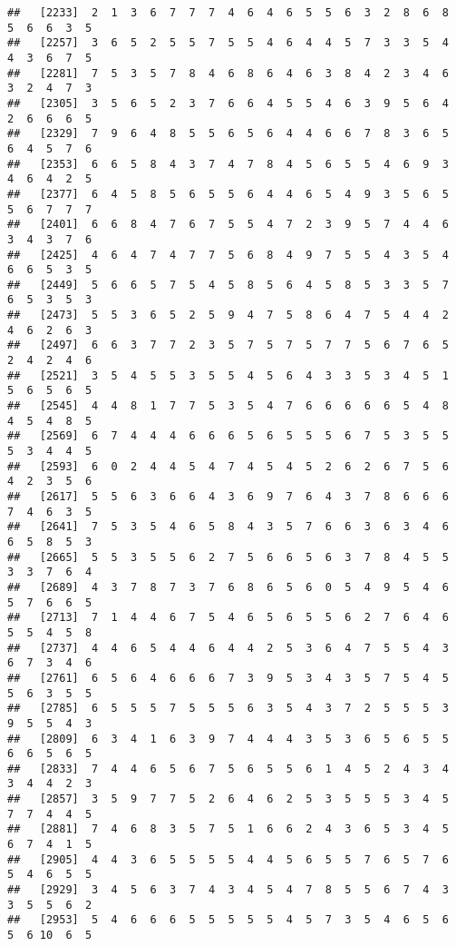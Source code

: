 \documentclass[
]{book}
\begin{document}
\begin{verbatim}
##   [2233]  2  1  3  6  7  7  7  4  6  4  6  5  5  6  3  2  8  6  8  5  6  6  3  5
##   [2257]  3  6  5  2  5  5  7  5  5  4  6  4  4  5  7  3  3  5  4  4  3  6  7  5
##   [2281]  7  5  3  5  7  8  4  6  8  6  4  6  3  8  4  2  3  4  6  3  2  4  7  3
##   [2305]  3  5  6  5  2  3  7  6  6  4  5  5  4  6  3  9  5  6  4  2  6  6  6  5
##   [2329]  7  9  6  4  8  5  5  6  5  6  4  4  6  6  7  8  3  6  5  6  4  5  7  6
##   [2353]  6  6  5  8  4  3  7  4  7  8  4  5  6  5  5  4  6  9  3  4  6  4  2  5
##   [2377]  6  4  5  8  5  6  5  5  6  4  4  6  5  4  9  3  5  6  5  5  6  7  7  7
##   [2401]  6  6  8  4  7  6  7  5  5  4  7  2  3  9  5  7  4  4  6  3  4  3  7  6
##   [2425]  4  6  4  7  4  7  7  5  6  8  4  9  7  5  5  4  3  5  4  6  6  5  3  5
##   [2449]  5  6  6  5  7  5  4  5  8  5  6  4  5  8  5  3  3  5  7  6  5  3  5  3
##   [2473]  5  5  3  6  5  2  5  9  4  7  5  8  6  4  7  5  4  4  2  4  6  2  6  3
##   [2497]  6  6  3  7  7  2  3  5  7  5  7  5  7  7  5  6  7  6  5  2  4  2  4  6
##   [2521]  3  5  4  5  5  3  5  5  4  5  6  4  3  3  5  3  4  5  1  5  6  5  6  5
##   [2545]  4  4  8  1  7  7  5  3  5  4  7  6  6  6  6  6  5  4  8  4  5  4  8  5
##   [2569]  6  7  4  4  4  6  6  6  5  6  5  5  5  6  7  5  3  5  5  5  3  4  4  5
##   [2593]  6  0  2  4  4  5  4  7  4  5  4  5  2  6  2  6  7  5  6  4  2  3  5  6
##   [2617]  5  5  6  3  6  6  4  3  6  9  7  6  4  3  7  8  6  6  6  7  4  6  3  5
##   [2641]  7  5  3  5  4  6  5  8  4  3  5  7  6  6  3  6  3  4  6  6  5  8  5  3
##   [2665]  5  5  3  5  5  6  2  7  5  6  6  5  6  3  7  8  4  5  5  3  3  7  6  4
##   [2689]  4  3  7  8  7  3  7  6  8  6  5  6  0  5  4  9  5  4  6  5  7  6  6  5
##   [2713]  7  1  4  4  6  7  5  4  6  5  6  5  5  6  2  7  6  4  6  5  5  4  5  8
##   [2737]  4  4  6  5  4  4  6  4  4  2  5  3  6  4  7  5  5  4  3  6  7  3  4  6
##   [2761]  6  5  6  4  6  6  6  7  3  9  5  3  4  3  5  7  5  4  5  5  6  3  5  5
##   [2785]  6  5  5  5  7  5  5  5  6  3  5  4  3  7  2  5  5  5  3  9  5  5  4  3
##   [2809]  6  3  4  1  6  3  9  7  4  4  4  3  5  3  6  5  6  5  5  6  6  5  6  5
##   [2833]  7  4  4  6  5  6  7  5  6  5  5  6  1  4  5  2  4  3  4  3  4  4  2  3
##   [2857]  3  5  9  7  7  5  2  6  4  6  2  5  3  5  5  5  3  4  5  7  7  4  4  5
##   [2881]  7  4  6  8  3  5  7  5  1  6  6  2  4  3  6  5  3  4  5  6  7  4  1  5
##   [2905]  4  4  3  6  5  5  5  5  4  4  5  6  5  5  7  6  5  7  6  5  4  6  5  5
##   [2929]  3  4  5  6  3  7  4  3  4  5  4  7  8  5  5  6  7  4  3  3  5  5  6  2
##   [2953]  5  4  6  6  6  5  5  5  5  5  4  5  7  3  5  4  6  5  6  5  6 10  6  5

\end{verbatim}
\end{document}
